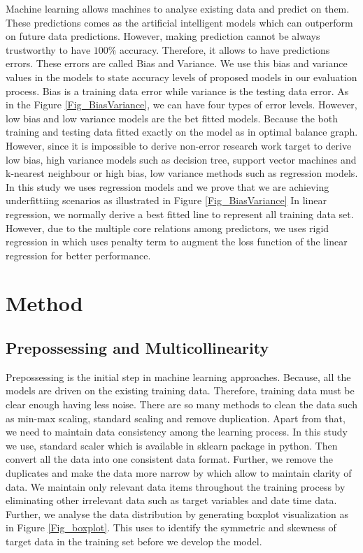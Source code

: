 Machine learning allows machines to analyse existing data and 
predict on them. These predictions comes as the 
artificial intelligent models which can outperform on future data predictions. 
However, making prediction cannot be always trustworthy 
to have $100\%$ accuracy. 
Therefore, it allows to have predictions errors. 
These errors are called Bias and Variance.
We use this bias and variance values in the models to state 
accuracy levels of proposed models in our evaluation process.
Bias is a training data error while variance is the testing data error.
As in the Figure \ref{Fig_BiasVariance}, we can have four types of error levels.
However, low bias and low variance models are the bet fitted models.
Because the both training and testing data fitted exactly on 
the model as in optimal balance graph.
However, since it is impossible to derive non-error research 
work target to derive low bias, high variance models such as 
decision tree, support vector machines and k-nearest neighbour or high bias, low variance methods such as regression models.
In this study we uses regression models and we prove that
we are achieving underfittiing scenarios as illustrated in Figure \ref{Fig_BiasVariance}
In linear regression, we normally derive a best fitted line to represent all training data set.
However, due to the multiple core relations among predictors, we uses rigid regression in which uses penalty term to 
augment the loss function of the linear regression for better performance.
\section{Method} \label{sec-method}


\subsection{Prepossessing and Multicollinearity}


 Prepossessing is the initial step in machine learning approaches.
 Because, all the models are driven on the existing training data. 
 Therefore, training data must be clear enough having less noise.
 There are so many methods to clean the data such as min-max scaling, standard scaling and remove duplication.
 Apart from that, we need to maintain data consistency among the learning process.
 In this study we use, standard scaler which is available in sklearn package in python.
 Then convert all the data into one consistent data format.
 Further, we remove the duplicates and make the data more narrow by which allow to maintain clarity of data.
 We maintain only relevant data items throughout the training process by eliminating other irrelevant data such as target variables and date time data.
 Further, we analyse the data distribution by generating boxplot visualization as in Figure \ref{Fig_boxplot}.
 This uses to identify the symmetric and skewness of target data in the training set before we develop the model.
 
